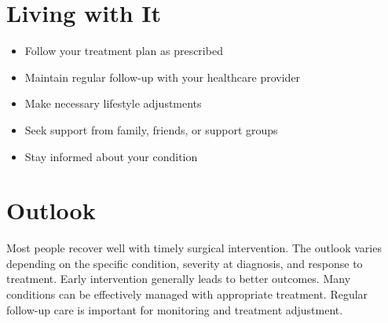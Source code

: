 \section{Living with It}
\begin{itemize}[noitemsep]
  \item Follow your treatment plan as prescribed
  \item Maintain regular follow-up with your healthcare provider
  \item Make necessary lifestyle adjustments
  \item Seek support from family, friends, or support groups
  \item Stay informed about your condition
\end{itemize}
\section{Outlook}
Most people recover well with timely surgical intervention. The outlook varies depending on the specific condition, severity at diagnosis, and response to treatment. Early intervention generally leads to better outcomes. Many conditions can be effectively managed with appropriate treatment. Regular follow-up care is important for monitoring and treatment adjustment.
